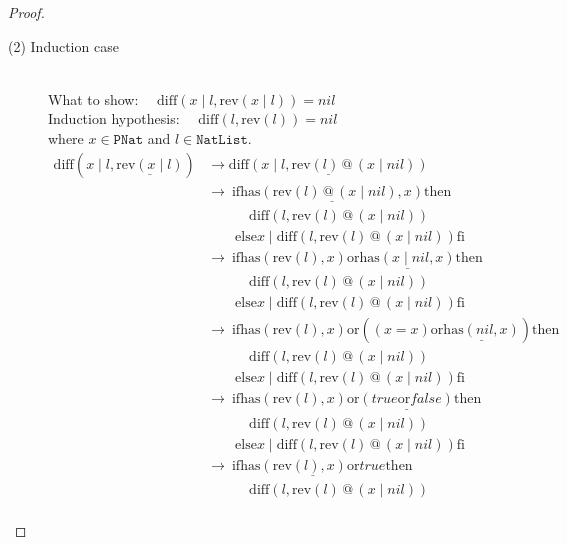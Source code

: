 \documentclass[12pt, a4paper]{article}
\newcommand{\rel}[1]{\mathrel{#1}}
\newcommand{\rmx}[1]{\mathrm{#1}}
\newcommand{\larrow}{\longrightarrow}
\newcommand{\under}{\underline}
\begin{document}
\begin{proof}
\begin{description}
\item[(2) Induction case]~\\
What to show: $\quad \rmx{diff}(x \rel{|} l, \rmx{rev}(x \rel{|} l)) = nil$ \\
Induction hypothesis: $\quad \rmx{diff}(l, \rmx{rev}(l)) = nil$  \\
where $x \in \mathtt{PNat}$ and $l \in \mathtt{NatList}$.
\begin{align*}
\rmx{diff}(x \rel{|} l, \under{\rmx{rev}(x \rel{|} l)})
	&\larrow \under{\rmx{diff}(x \rel{|} l, \rmx{rev}(l) \rel{@} (x \rel{|} nil))} \tag{by rev2} \\
	&\larrow\ \rel{\rmx{if}} \under{\rmx{has}(\rmx{rev}(l) \rel{@} (x \rel{|} nil), x)} \rel{\rmx{then}} \\
	&\quad \quad \quad \rmx{diff}(l, \rmx{rev}(l) \rel{@} (x \rel{|} nil)) \\
	&\quad \quad \rel{\rmx{else}} x \rel{|} \rmx{diff}(l, \rmx{rev}(l) \rel{@}(x \rel{|} nil)) \rel{\rmx{fi}} \tag{by diff2} \\
	&\larrow\ \rel{\rmx{if}} \rmx{has}(\rmx{rev}(l), x) \rel{\rmx{or}} \under{\rmx{has}(x \rel{|} nil, x)} \rel{\rmx{then}} \\
	&\quad \quad \quad \rmx{diff}(l, \rmx{rev}(l) \rel{@} (x \rel{|} nil)) \\
	&\quad \quad \rel{\rmx{else}} x \rel{|} \rmx{diff}(l, \rmx{rev}(l) \rel{@}(x \rel{|} nil)) \rel{\rmx{fi}} \tag{by Lemma 1 from Problem 6} \\	
	&\larrow\ \rel{\rmx{if}} \rmx{has}(\rmx{rev}(l), x) \rel{\rmx{or}} ((x = x) \rel{\rmx{or}} \under{\rmx{has}(nil, x)}) \rel{\rmx{then}} \\
	&\quad \quad \quad \rmx{diff}(l, \rmx{rev}(l) \rel{@} (x \rel{|} nil)) \\
	&\quad \quad \rel{\rmx{else}} x \rel{|} \rmx{diff}(l, \rmx{rev}(l) \rel{@}(x \rel{|} nil)) \rel{\rmx{fi}} \tag{by has2} \\
	&\larrow\ \rel{\rmx{if}} \rmx{has}(\rmx{rev}(l), x) \rel{\rmx{or}} \under{(true \rel{\rmx{or}} false)} \rel{\rmx{then}} \\
	&\quad \quad \quad \rmx{diff}(l, \rmx{rev}(l) \rel{@} (x \rel{|} nil)) \\
	&\quad \quad \rel{\rmx{else}} x \rel{|} \rmx{diff}(l, \rmx{rev}(l) \rel{@}(x \rel{|} nil)) \rel{\rmx{fi}} \tag{by has1} \\
	&\larrow\ \rel{\rmx{if}} \under{\rmx{has}(\rmx{rev}(l), x) \rel{\rmx{or}} true} \rel{\rmx{then}} \\
	&\quad \quad \quad \rmx{diff}(l, \rmx{rev}(l) \rel{@} (x \rel{|} nil)) \\

\end{align*}
\end{description}
\end{proof}
\end{document}
